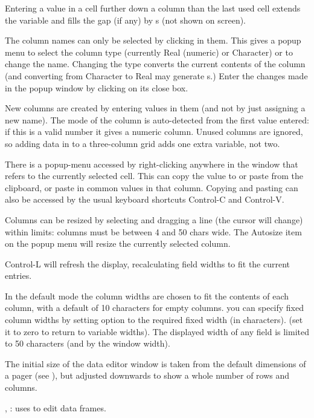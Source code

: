 \begin{Note}
Entering a value in a cell further down a column than the last used
cell extends the variable and fills the gap (if any) by s (not
shown on screen).

The column names can only be selected by clicking in them.  This gives
a popup menu to select the column type (currently Real (numeric) or
Character) or to change the name.  Changing the type converts the
current contents of the column (and converting from Character to Real
may generate s.)
Enter the changes made in the popup window by clicking on its close box.

New columns are created by entering values in them (and not by just
assigning a new name).  The mode of the column is auto-detected from
the first value entered: if this is a valid number it gives a numeric
column.  Unused columns are ignored, so
adding data in  to a three-column grid adds one extra
variable, not two.

There is a popup-menu accessed by right-clicking anywhere in the window
that refers to the currently selected cell. This can copy the value to
or paste from the clipboard, or paste in common values in that column.
Copying and pasting can also be accessed by the usual keyboard shortcuts
Control-C and Control-V.

Columns can be resized by selecting and dragging a line (the cursor
will change) within limits: columns must be between 4 and 50 chars wide.
The Autosize item on the popup menu will resize the currently selected
column.

Control-L will refresh the display, recalculating field widths to fit
the current entries.

In the default mode the column widths are chosen to fit the contents
of each column, with a default of 10 characters for empty columns.
you can specify fixed column widths by setting option
 to the required fixed width (in characters).
(set it to zero to return to variable widths).  The displayed
width of any field is limited to
50 characters (and by the window width).

The initial size of the data editor window is taken from the default
dimensions of a pager (see ), but adjusted
downwards to show a whole number of rows and columns.
\end{Note}
%
\begin{SeeAlso}\relax
{}, :  uses
 to edit data frames.
\end{SeeAlso}

